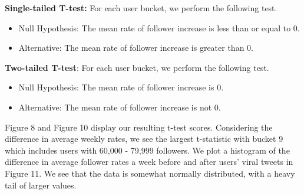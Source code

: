 \documentclass[twoside,twocolumn]{article}
\begin{document}
\noindent\textbf{Single-tailed T-test:} For each user bucket, we perform the following test.
\begin{itemize}
\item Null Hypothesis: The mean rate of follower increase is less than or equal to 0.
\item Alternative: The mean rate of follower increase is greater than 0.
\end{itemize}

\noindent\textbf{Two-tailed T-test}: For each user bucket, we perform the following test.
\begin{itemize}
  \item Null Hypothesis: The mean rate of follower increase is 0.
  \item Alternative: The mean rate of follower increase is not 0.
\end{itemize}

Figure 8 and Figure 10  display our resulting t-test scores. Considering the difference in average weekly rates, we see the largest t-statistic with bucket 9 which includes users with 60,000 - 79,999 followers. We plot a histogram of the difference in average follower rates a week before and after users’ viral tweets in Figure 11. We see that the data is somewhat normally distributed, with a heavy tail of larger values.\\
\end{document}
